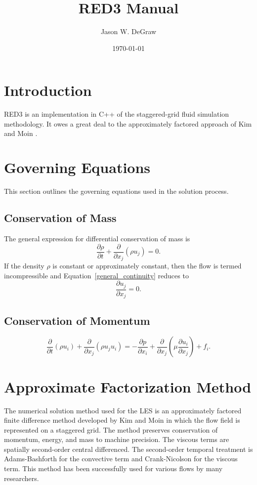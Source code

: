 \documentclass[10pt]{article}
\title{RED3 Manual}
\author{Jason W. DeGraw}
\date{\today}
\newcommand{\eqn}[1]{Equation~\ref{#1}}
\begin{document}
\maketitle
\tableofcontents
%
\section{Introduction}
RED3 is an implementation in C++ of the staggered-grid fluid simulation
methodology.  It owes a great deal to the approximately factored
approach of Kim and Moin \cite{kim_moin85}.
%
\section{Governing Equations}
This section outlines the governing equations used in the solution process.
\subsection{Conservation of Mass}
The general expression for differential conservation of mass is
\begin{equation}\label{general_continuity}
\frac{\partial\rho}{\partial t} + \frac{\partial}{\partial x_j}
\left(\rho u_j\right) = 0.
\end{equation}
If the density $\rho$ is constant or approximately constant, then the flow is
termed incompressible and \eqn{general_continuity} reduces to
\begin{equation}\label{incompressible_continuity}
\frac{\partial u_j}{\partial x_j}=0.
\end{equation}
%
\subsection{Conservation of Momentum}
\begin{equation}\label{general_navier_stokes}
\frac{\partial}{\partial t}\left(\rho u_i\right)  + \frac{\partial}{\partial x_j}
\left(\rho u_ju_i\right) = -\frac{\partial p}{\partial x_i}
 + \frac{\partial}{\partial x_j}\left(\mu\frac{\partial u_i}{\partial x_j}\right)
 + f_i.
\end{equation}
%
\section{Approximate Factorization Method}\label{fracstep} The
numerical solution method used for the LES is an approximately
factored finite difference method developed by Kim and Moin
\cite{kim_moin85} in which the flow field is represented on a
staggered grid.  The method preserves conservation of momentum,
energy, and mass to machine precision.  The viscous terms are
spatially second-order central differenced.  The second-order temporal
treatment is Adams-Bashforth for the convective term and
Crank-Nicolson for the viscous term.  This method has been
successfully used for various flows by many researchers.
\end{document}
